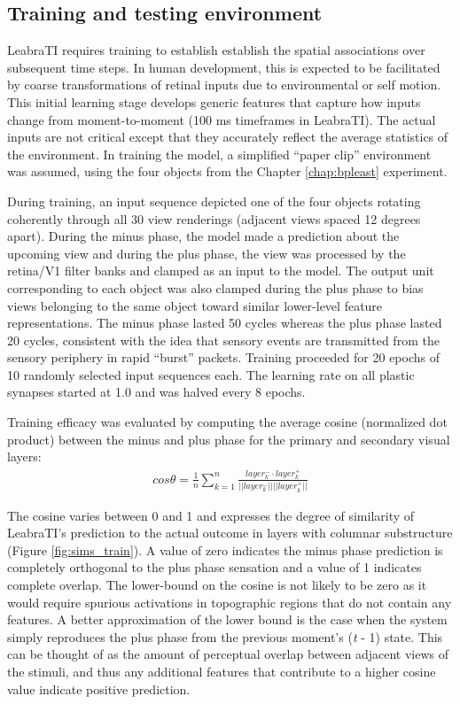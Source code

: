 \documentclass[dwyatte_dissertation.tex]{subfiles}
\begin{document}
\subsection{Training and testing environment}
LeabraTI requires training to establish establish the spatial associations over subsequent time steps. In human development, this is expected to be facilitated by coarse transformations of retinal inputs due to environmental or self motion. This initial learning stage develops generic features that capture how inputs change from moment-to-moment (100 ms timeframes in LeabraTI). The actual inputs are not critical except that they accurately reflect the average statistics of the environment. In training the model, a simplified  ``paper clip'' environment was assumed, using the four objects from the Chapter \ref{chap:bpleast} experiment.

During training, an input sequence depicted one of the four objects rotating coherently through all 30 view renderings (adjacent views spaced 12 degrees apart). During the minus phase, the model made a prediction about the upcoming view and during the plus phase, the view was processed by the retina/V1 filter banks and clamped as an input to the model. The output unit corresponding to each object was also clamped during the plus phase to bias views belonging to the same object toward similar lower-level feature representations. The minus phase lasted 50 cycles whereas the plus phase lasted 20 cycles, consistent with the idea that sensory events are transmitted from the sensory periphery in rapid ``burst'' packets.  Training proceeded for 20 epochs of 10 randomly selected input sequences each. The learning rate on all plastic synapses started at 1.0 and was halved every 8 epochs.

Training efficacy was evaluated by computing the average cosine (normalized dot product) between the minus and plus phase for the primary and secondary visual layers:
\begin{align*}
cos \theta = \frac{1}{n}\sum_{k=1}^{n}\frac{layer_k^- \cdot{} layer_k^+}{||layer_k^-||||layer_k^+||}
\end{align*}

The cosine varies between 0 and 1 and expresses the degree of similarity of LeabraTI's prediction to the actual outcome in layers with columnar substructure (Figure \ref{fig:sims_train}). A value of zero indicates the minus phase prediction is completely orthogonal to the plus phase sensation and a value of 1 indicates complete overlap. The lower-bound on the cosine is not likely to be zero as it would require spurious activations in topographic regions that do not contain any features. A better approximation of the lower bound is the case when the system simply reproduces the plus phase from the previous moment's (\textit{t} - 1) state. This can be thought of as the amount of perceptual overlap between adjacent views of the stimuli, and thus any additional features that contribute to a higher cosine value indicate positive prediction.
\end{document}
